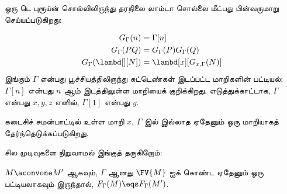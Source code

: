 \documentclass[../../../include/open-logic-section]{subfiles}
\begin{document}
ஒரு டெ புரூய்ன் சொல்லிலிருந்து தரநிலை லாம்டா சொல்லை மீட்பது பின்வருமாறு
செய்யப்படுகிறது:

\begin{defn}
  \begin{align*}
    G_\Gamma(n) &= \Gamma[n] \\
    G_\Gamma(PQ) &= G_\Gamma(P) G_\Gamma(Q) \\
    G_\Gamma(\lambd[][N]) &= \lambd[x][G_{x,\Gamma}(N)]
  \end{align*}
  இங்கும் $\Gamma$ என்பது பூச்சியத்திலிருந்து சுட்டெண்கள் இடப்பட்ட மாறிகளின்
  பட்டியல்; $\Gamma[n]$ என்பது $n$ ஆம் இடத்திலுள்ள மாறியைக் குறிக்கிறது.
  எடுத்துக்காட்டாக, $\Gamma$ என்பது $x,y,z$ எனில், $\Gamma[1]$ என்பது $y$.

  கடைசிச் சமன்பாட்டில் உள்ள மாறி $x$, $\Gamma$ இல் இல்லாத ஏதேனும் ஒரு
  மாறியாகத் தேர்ந்தெடுக்கப்படுகிறது.
\end{defn}

சில முடிவுகளை நிறுவாமல் இங்குத் தருகிறோம்:

\begin{prop}
  $M \aconvone M'$ ஆகவும், $\Gamma$ ஆனது $\FV{M}$ ஐக் கொண்ட ஏதேனும் ஒரு
  பட்டியலாகவும் இருந்தால், $F_\Gamma(M) \eqs F_\Gamma(M')$.
\end{prop}
\end{document}

